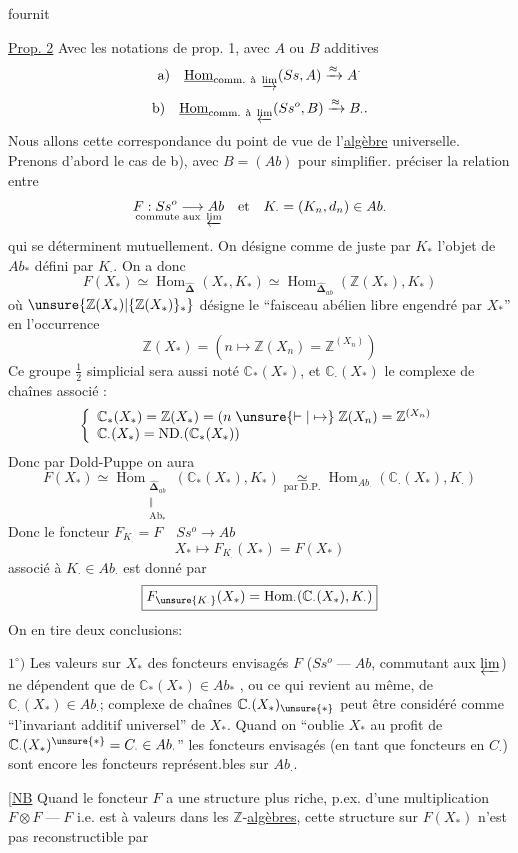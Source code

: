 fournit 

\uline{Prop. 2} Avec les notations  de prop. 1, avec $A$ ou $B$
additives 
\[
 \text{a)}\quad\underline{\operatorname{Hom}}_{\text{comm. à }\varinjlim}(Ss,A)
 \xrightarrow{\approx}A^{\cdot}
\]
\[
 \text{b)}\quad\underline{\operatorname{Hom}}_{\text{comm. à }\varprojlim}(Ss^o,B)
 \xrightarrow{\approx}B_{\cdot}.
\]
Nous allons  cette correspondance du point
de vue de l'\uline{algèbre} universelle. Prenons d'abord le cas de b), avec
$B=(Ab)$ pour simplifier. 
 préciser la relation entre
\[
 \underset{\text{commute aux }\varprojlim}{F:Ss^o\longrightarrow Ab}
 \quad\text{et}\quad K_{\cdot}=(K_n,d_n)\in Ab_{\cdot}
\]
qui se déterminent mutuellement. On désigne comme de juste par $K_*$ l'objet
de $Ab_*$ défini par $K_{\cdot}$. On a donc
\[
 F(X_*)\simeq\operatorname{Hom}_{\widehat{\boldsymbol\Delta}}(X_*,K_*)
 \simeq\operatorname{Hom}_{\widehat{\boldsymbol\Delta}_{ab}}(\mathbb Z(X_*),K_*)
\]
où $\unsure{\mathbb Z(X_*)|\{\mathbb Z(X_*)\}_*}$ désigne le ``faisceau abélien
libre engendré par $X_*$'' en l'occurrence
\[
 \mathbb Z(X_*)=(n\longmapsto\mathbb Z(X_n)=\mathbb Z^{(X_n)})
\]
Ce groupe  $\tfrac12$ simplicial sera aussi noté $\mathbb C_*(X_*)$,
et $\mathbb C_{\cdot}(X_*)$ le complexe de chaînes associé :
\[
 \left\{\begin{array}{l}
 \mathbb C_*(X_*)=\mathbb Z(X_*)=(n\mathrel{\unsure{\vdash|\mapsto}}\mathbb Z(X_n)=\mathbb Z^{(X_n)}\\
 \mathbb C_{\cdot}(X_*)=\mathrm{ND}_{\cdot}(\mathbb C_*(X_*))
 \end{array}\right.
\]
Donc par Dold-Puppe on aura
\[
 F(X_*)\simeq
 \operatorname{Hom}_{\substack{\widehat{\boldsymbol\Delta}_{ab}\\\Vert\\\mathrm{Ab}_*}}
 (\mathbb C_*(X_*),K_*)
 \underset{\text{par D.P.}}{\simeq}
 \operatorname{Hom}_{Ab_{\cdot}}(\mathbb C_{\cdot}(X_*),K_{\cdot})
\]
Donc le foncteur $F_{K_{\cdot}}=F\quad Ss^o\longrightarrow Ab$
\[
 X_*\longmapsto F_{K_{\cdot}}(X_*)=F(X_*)
\]
associé à $K_{\cdot}\in Ab_{\cdot}$ est donné par
\[
 \boxed{F_{\unsure{K_{\cdot}}}(X_*)=\operatorname{Hom}_{\cdot}(\mathbb C_{\cdot}(X_*),K_{\cdot})}
\]
On en tire deux conclusions:

$1^\circ)$ Les valeurs sur $X_*$ des foncteurs envisagés $F$
($Ss^o\mathbin{\text{---}}Ab$, commutant aux $\varprojlim$) ne dépendent que de
$\mathbb C_*(X_*)\in Ab_*$ , ou ce qui revient
au même, de $\mathbb C_{\cdot}(X_*)\in Ab_{\cdot}$;
 complexe de chaînes $\mathbb C_{\cdot}(X_*)_{\unsure{*}}$
peut être considéré comme ``l'invariant additif universel'' de $X_*$.
Quand on ``oublie $X_*$ au profit de $\mathbb C_{\cdot}(X_*)^{\unsure{*}}=C_{\cdot}\in Ab_{\cdot}$''
les foncteurs envisagés (en tant que foncteurs en $C_{\cdot}$) sont encore
 les foncteurs représent.bles sur $Ab_{\cdot}$.

[\uline{NB} Quand le foncteur $F$ a une structure plus riche, p.ex. d'une
multiplication $F\otimes F\mathbin{\text{---}}F$ i.e. est à valeurs dans les
$\mathbb Z$-\uline{algèbres},  cette structure sur $F(X_*)$
n'est pas reconstructible par

